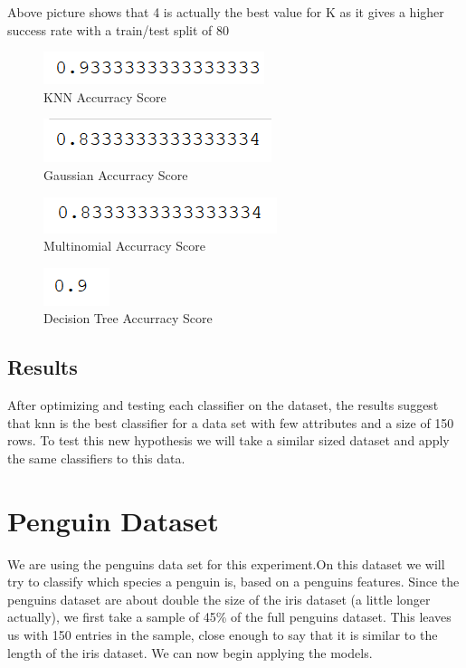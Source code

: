 \documentclass{article}
\begin{document}
Above picture shows that 4 is actually the best value for K as it gives a higher success rate with a train/test split of 80%



\begin{figure}[!h]
  \caption{KNN Accurracy Score}
  \centering
      \includegraphics[scale=0.7]{successIris.png}
\end{figure}


\begin{figure}[!h]
  \centering
  \caption{Gaussian Accurracy Score}
    \includegraphics[scale=0.7]{GaussianIris.png}
\end{figure}


\begin{figure}[!h]
  \caption{Multinomial Accurracy Score}
  \centering
    \includegraphics[scale=0.7]{multiIris.png}
\end{figure}

\begin{figure}[!h]
  \caption{Decision Tree Accurracy Score}
  \centering
    \includegraphics[scale=0.7]{treeIris.png}
\end{figure}
\FloatBarrier

\subsection{Results}
After optimizing and testing each classifier on the dataset, the results suggest that knn is the best classifier for a data set with few attributes and a size of 150 rows. To test this new hypothesis we will take a similar sized dataset and apply the same classifiers to this data. 

\section{Penguin Dataset}
We are using the penguins data set for this experiment.On this dataset we will try to classify which species a penguin is, based on a penguins features. Since the penguins dataset are about double the size of the iris dataset (a little longer actually), we first take a sample of 45\% of the full penguins dataset. This leaves us with 150 entries in the sample, close enough to say that it is similar to the length of the iris dataset.  We can now begin applying the models.
\end{document}
